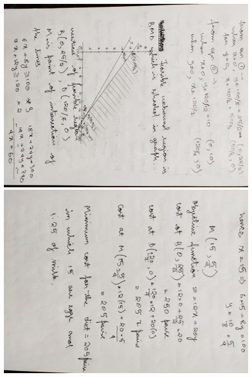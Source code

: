 \documentclass[12pt, letterpaper, twoside]{book}
\begin{document}
\includegraphics[width=\paperheight, height=\paperwidth, angle=90]{Page7}
\includegraphics[width=\paperheight, height=\paperwidth, angle=90]{Page8}
\end{document}
